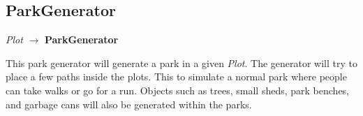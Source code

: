 \subsection{ParkGenerator}
\begin{center}
    \textit{Plot} $\rightarrow$ \textbf{ParkGenerator}                        
\end{center}
This park generator will generate a park in a given \textit{Plot}. 
The generator will try to place a few paths inside the plots. 
This to simulate a normal park where people can take walks or go for a run.
Objects such as trees, small sheds, park benches, and garbage cans will also be generated within the parks.
